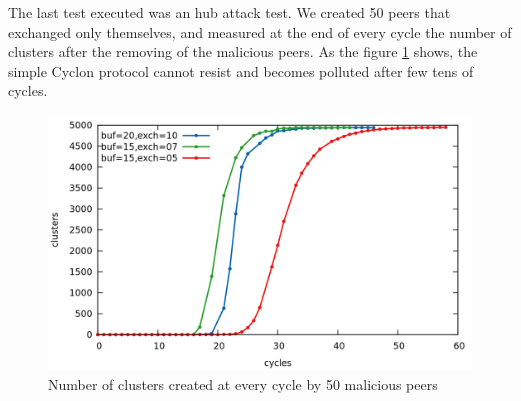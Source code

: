 \documentclass[a4paper,12pt,notitlepage]{article} %
\begin{document}
The last test executed was an hub attack test. We created 50 peers that exchanged only themselves, and measured
 at the end of every cycle the number of clusters after the removing of the malicious peers. As the 
 figure \ref{attack} shows, the simple Cyclon protocol cannot resist and becomes polluted after few tens of cycles.

\begin{figure} [H]
	\centering
	\includegraphics[width=1\textwidth]{img/attack}
	\caption{Number of clusters created at every cycle by 50 malicious peers}
	\label{attack}
\end{figure}
\end{document}
